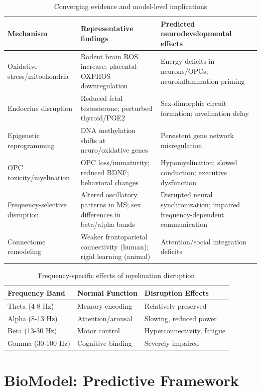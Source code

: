 \documentclass[12pt]{article}
\begin{document}
\begin{table}[h]
\centering
\caption{Converging evidence and model-level implications}
\label{tab:mechanisms}
\begin{tabular}{@{}p{3cm}p{5cm}p{5cm}@{}}
\toprule
\textbf{Mechanism} & \textbf{Representative findings} & \textbf{Predicted neurodevelopmental effects} \\
\midrule
Oxidative stress/mitochondria & Rodent brain ROS increase; placental OXPHOS downregulation & Energy deficits in neurons/OPCs; neuroinflammation priming \\
Endocrine disruption & Reduced fetal testosterone; perturbed thyroid/PGE2 & Sex-dimorphic circuit formation; myelination delay \\
Epigenetic reprogramming & DNA methylation shifts at neuro/oxidative genes & Persistent gene network misregulation \\
OPC toxicity/myelination & OPC loss/immaturity; reduced BDNF; behavioral changes & Hypomyelination; slowed conduction; executive dysfunction \\
Frequency-selective disruption & Altered oscillatory patterns in MS; sex differences in beta/alpha bands & Disrupted neural synchronization; impaired frequency-dependent communication \\
Connectome remodeling & Weaker frontoparietal connectivity (human); rigid learning (animal) & Attention/social integration deficits \\
\bottomrule
\end{tabular}
\end{table}

\begin{table}[h]
\centering
\caption{Frequency-specific effects of myelination disruption}
\label{tab:frequencies}
\begin{tabular}{@{}lll@{}}
\toprule
\textbf{Frequency Band} & \textbf{Normal Function} & \textbf{Disruption Effects} \\
\midrule
Theta (4-8 Hz) & Memory encoding & Relatively preserved \\
Alpha (8-13 Hz) & Attention/arousal & Slowing, reduced power \\
Beta (13-30 Hz) & Motor control & Hyperconnectivity, fatigue \\
Gamma (30-100 Hz) & Cognitive binding & Severely impaired \\
\bottomrule
\end{tabular}
\end{table}

\section{BioModel: Predictive Framework}
\end{document}
